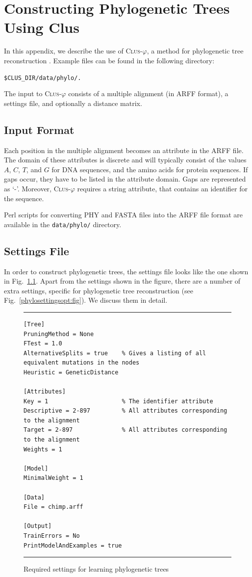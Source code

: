 \documentclass[a4paper]{report}
\newcommand{\clusphy}{\textsc{Clus}-$\varphi$}
\begin{document}
\appendix
\chapter{Constructing Phylogenetic Trees Using Clus}

In this appendix, we describe the use of \clusphy{}, a method for phylogenetic tree reconstruction \cite{Vens10:proc}.
Example files can be found in the following directory:  
\begin{flushleft}
\verb^$CLUS_DIR/data/phylo/.^
\end{flushleft}

The input to \clusphy{} consists of a multiple alignment (in ARFF format), a settings file, and optionally a distance matrix.

\section{Input Format}
Each position in the multiple alignment becomes an attribute in the ARFF file. The domain of these attributes is discrete and will typically consist of the values $A$, $C$, $T$, and $G$ for DNA sequences, and the amino acids for protein sequences. If gaps occur, they have to be listed in the attribute domain. Gaps are represented as `-'.
Moreover, \clusphy{} requires a string attribute, that contains an identifier for the sequence.

Perl scripts for converting PHY and FASTA files into the ARFF file format are available in the {\tt data/phylo/} directory.

\section{Settings File}
In order to construct phylogenetic trees, the settings file looks like the one shown in Fig.~\ref{phylosettingsreq:fig}. Apart from the settings shown in the figure, there are a number of extra settings, specific for phylogenetic tree reconstruction (see Fig.~\ref{phylosettingsopt:fig}). We discuss them in detail.

\begin{figure}[tb]
\hrule\vspace{1em}
\begin{verbatim}
[Tree]
PruningMethod = None    
FTest = 1.0    
AlternativeSplits = true    % Gives a listing of all equivalent mutations in the nodes 
Heuristic = GeneticDistance

[Attributes]
Key = 1                     % The identifier attribute
Descriptive = 2-897         % All attributes corresponding to the alignment
Target = 2-897              % All attributes corresponding to the alignment
Weights = 1

[Model]
MinimalWeight = 1
    
[Data]
File = chimp.arff

[Output]
TrainErrors = No
PrintModelAndExamples = true
\end{verbatim}
\hrule
\caption{Required settings for learning phylogenetic trees}
\label{phylosettingsreq:fig}
\end{figure}
\end{document}
